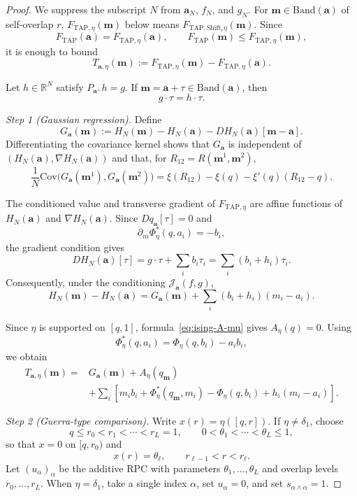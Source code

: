 \documentclass[a4paper,10pt,reqno]{amsart}
\numberwithin{equation}{section}
\newcommand{\dR}{\mathbb{R}}%
\newcommand{\Cov}{\mathrm{Cov} }%
\newcommand{\mc}{\mathcal}
\newcommand{\TAP}{\mathrm{TAP}}
\newcommand{\Band}{\mathrm{Band}}
\newcommand{\bfm}{\mathbf{m}}
\newcommand{\bfa}{\mathbf{a}}
\newcommand{\Shift}{\mathrm{Shift}}%
\begin{document}
	\begin{proof}
		We suppress the subscript \(N\) from \(\bfa_N\), \(f_N\), and \(g_N\).
		For $\bfm\in\Band(\bfa)$ of self-overlap $r$,
		$F_{\TAP,\eta}(\bfm)$ below means
		$F_{\TAP,\Shift_r\eta}(\bfm)$. Since
		\[
		F_{\TAP}(\bfa)=F_{\TAP,\eta}(\bfa),
		\qquad
		F_{\TAP}(\bfm)\le F_{\TAP,\eta}(\bfm),
		\]
		it is enough to bound
		\[
		T_{\bfa,\eta}(\bfm)
		:=
		F_{\TAP,\eta}(\bfm)-F_{\TAP,\eta}(\bfa).
		\]
		
		Let $h\in\dR^N$ satisfy $P_{\bfa^\perp}h=g$. If
		$\bfm=\bfa+\tau\in\Band(\bfa)$, then
		\[
		g\cdot\tau=h\cdot\tau.
		\]
		
		\medskip\noindent\emph{Step 1 (Gaussian regression).}\;
		Define
		\[
		G_{\bfa}(\bfm)
		:=
		H_N(\bfm)-H_N(\bfa)-DH_N(\bfa)[\bfm-\bfa].
		\]
		Differentiating the covariance kernel shows that $G_{\bfa}$ is
		independent of $(H_N(\bfa),\nabla H_N(\bfa))$ and that, for
		$R_{12}=R(\bfm^1,\bfm^2)$,
		\[
		\frac1N
		\Cov\bigl(
		G_{\bfa}(\bfm^1),G_{\bfa}(\bfm^2)
		\bigr)
		=
		\xi(R_{12})-\xi(q)-\xi'(q)(R_{12}-q).
		\]
		
		The conditioned value and transverse gradient of $F_{\TAP,\eta}$ are affine
		functions of $H_N(\bfa)$ and $\nabla H_N(\bfa)$. Since
		$Dq_{\bfa}[\tau]=0$ and
		\[
		\partial_m\Phi_\eta^*(q,a_i)=-b_i,
		\]
		the gradient condition gives
		\[
		DH_N(\bfa)[\tau]
		=
		g\cdot\tau+\sum_i b_i\tau_i
		=
		\sum_i(b_i+h_i)\tau_i.
		\]
		Consequently, under the conditioning $\mc J_{\bfa}(f,g)$,
		\[
		H_N(\bfm)-H_N(\bfa)
		=
		G_{\bfa}(\bfm)
		+
		\sum_i(b_i+h_i)(m_i-a_i).
		\]
		
		Since $\eta$ is supported on $[q,1]$,
		formula~\eqref{eq:ising-A-mu} gives $A_\eta(q)=0$. Using
		\[
		\Phi_\eta^*(q,a_i)=\Phi_\eta(q,b_i)-a_i b_i,
		\]
		we obtain
		\[
		\begin{aligned}
			T_{\bfa,\eta}(\bfm)
			={}&
			G_{\bfa}(\bfm)+A_\eta(q_\bfm)\\
			&+
			\sum_i
			\left[
			m_i b_i
			+\Phi_\eta^*(q_\bfm,m_i)
			-\Phi_\eta(q,b_i)
			+h_i(m_i-a_i)
			\right].
		\end{aligned}
		\]
		
		\medskip\noindent\emph{Step 2 (Guerra-type comparison).}\;
		Write $x(r)=\eta([q,r])$. If $\eta\ne\delta_1$, choose
		\[
		q\le r_0<r_1<\cdots<r_L=1,
		\qquad
		0<\theta_1<\cdots<\theta_L\le1,
		\]
		so that $x=0$ on $[q,r_0)$ and
		\[
		x(r)=\theta_\ell,
		\qquad r_{\ell-1}<r<r_\ell.
		\]
		Let $(u_\alpha)_\alpha$ be the additive RPC with parameters
		$\theta_1,\ldots,\theta_L$ and overlap levels
		$r_0,\ldots,r_L$. When $\eta=\delta_1$, take a single index
		$\alpha$, set $u_\alpha=0$, and set
		$s_{\alpha\wedge\alpha}=1$.
		

\end{proof}
\end{document}

